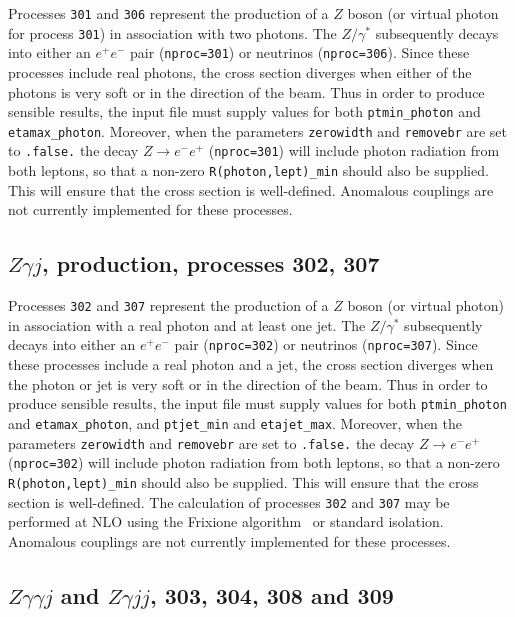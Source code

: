 Processes {\tt{301}} and {\tt{306}} represent the production of a $Z$ boson 
(or virtual photon for process {\tt 301}) in association with two photons.   The $Z/\gamma^*$ subsequently decays into 
either an $e^+ e^-$ pair ({\tt nproc=301}) or neutrinos ({\tt nproc=306}).
Since these processes include real photons, the cross section diverges
when either of the photons is very soft or in the direction of the beam.
Thus in order to produce sensible results, the input file must supply values for both
{\tt ptmin\_photon} and {\tt etamax\_photon}. Moreover, when the parameters {\tt zerowidth}
and {\tt removebr} are set to {\tt .false.} the decay $Z \to e^- e^+$ ({\tt nproc=301})
will include photon radiation from both leptons, so that a non-zero {\tt R(photon,lept)\_min}
should also be supplied. This will ensure that the cross section is well-defined.
Anomalous couplings are not currently implemented for these processes. 

\subsection{$Z\gamma j$, production, processes 302, 307}
\label{subsec:zgammajet}
Processes {\tt 302} and {\tt 307} represent the production of a $Z$ boson (or virtual photon)
in association with a real photon and at least one jet. 
The $Z/\gamma^*$ subsequently decays into 
either an $e^+ e^-$ pair ({\tt nproc=302}) or neutrinos ({\tt nproc=307}).
Since these processes include a real photon and a jet, the cross section diverges
when the photon or jet is very soft or in the direction of the beam.
Thus in order to produce sensible results, the input file must supply values for both
{\tt ptmin\_photon} and {\tt etamax\_photon}, and {\tt ptjet\_min} and {\tt etajet\_max}.
 Moreover, when the parameters {\tt zerowidth}
and {\tt removebr} are set to {\tt .false.} the decay $Z \to e^- e^+$ ({\tt nproc=302})
will include photon radiation from both leptons, so that a non-zero {\tt R(photon,lept)\_min}
should also be supplied. This will ensure that the cross section is well-defined.
The calculation of processes {\tt 302} and {\tt 307} may be performed
at NLO using the Frixione algorithm~\cite{Frixione:1998jh} or standard isolation. 
Anomalous couplings are not currently implemented for these processes. 


\subsection{$Z\gamma\gamma j$ and $Z\gamma j j $, 303, 304, 308 and 309}

